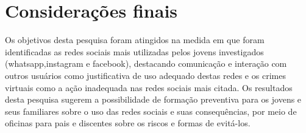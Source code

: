 \section{Considerações finais}

Os objetivos desta pesquisa foram atingidos na
medida em que foram identificadas as redes sociais
mais utilizadas pelos jovens investigados (whatsapp,instagram e facebook), destacando
comunicação e interação com outros usuários como
justificativa de uso adequado destas redes e os crimes virtuais como a ação inadequada nas redes sociais mais citada.
Os resultados desta pesquisa sugerem a
possibilidade de formação preventiva para os jovens e seus familiares sobre o uso das redes sociais e suas consequências, por meio de oficinas para pais e discentes sobre os riscos e formas de evitá-los.